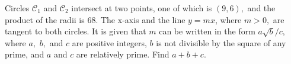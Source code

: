 Circles $\mathcal{C}_{1}$ and $\mathcal{C}_{2}$ intersect at two points, one of which is $(9,6),$ and the product of the radii is $68.$ The x-axis and the line $y=mx$, where $m>0,$ are tangent to both circles. It is given that $m$ can be written in the form $a\sqrt{b}/c,$ where $a,$ $b,$ and $c$ are positive integers, $b$ is not divisible by the square of any prime, and $a$ and $c$ are relatively prime. Find $a+b+c.$